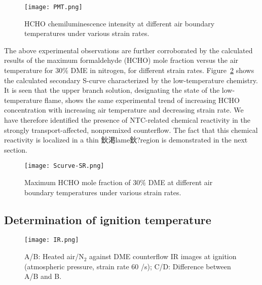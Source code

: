 \documentclass[review,3p,times]{elsarticleUS}
\begin{document}
\begin{figure}[t]
  \centering
  \scriptsize
  \vspace{-0.1in}
  \texttt{[image: PMT.png]}
  \normalsize
  \vspace{-0.1in}
  \caption{HCHO chemiluminescence intensity at different air boundary temperatures under various strain rates.}
  \label{fig:PMT}
\end{figure}

The above experimental observations are further corroborated by the calculated results of the maximum formaldehyde (HCHO) mole fraction versus the air temperature for $30\%$ DME in nitrogen, for different strain rates.  Figure~\ref{fig:Scurve-SR} shows the calculated secondary S-curve characterized by the low-temperature chemistry.  It is seen that the upper branch solution, designating the state of the low-temperature flame, shows the same experimental trend of increasing HCHO concentration with increasing air temperature and decreasing strain rate.  We have therefore identified the presence of NTC-related chemical reactivity in the strongly transport-affected, nonpremixed counterflow.  The fact that this chemical reactivity is localized in a thin 鈥渇lame鈥?region is demonstrated in the next section.

\begin{figure}[t]
  \centering
  \scriptsize
  \vspace{-0.1in}
  \texttt{[image: Scurve-SR.png]}
  \normalsize
  \vspace{-0.1in}
  \caption{Maximum HCHO mole fraction of $30\%$ DME at different air boundary temperatures under various strain rates.}
  \label{fig:Scurve-SR}
\end{figure}

\subsection{Determination of ignition temperature} \label{sec:4.2}

\begin{figure}[ht]
  \centering
  \scriptsize
  \vspace{0.1in}
  \texttt{[image: IR.png]}
  \normalsize
  \caption{A/B: Heated air/N$_2$ against DME counterflow IR images at ignition (atmospheric pressure, strain rate $60$ /s); C/D: Difference between A/B and B.}
  \label{fig:IR}
\end{figure}
\end{document}

